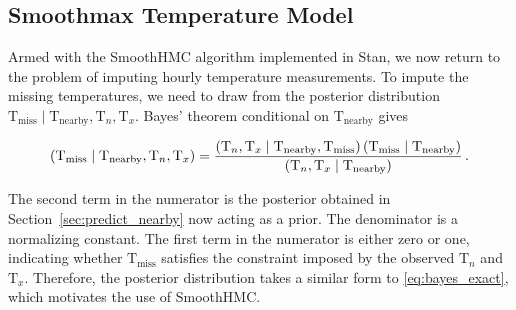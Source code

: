 \documentclass[letter]{article}
\newcommand{\genericdel}[3]{%
      \left#1#3\right#2
    }
\newcommand{\del}[1]{\genericdel(){#1}}
\let\Pr\relax
\DeclareMathOperator{\Pr}{\mathbb{P}}
\newcommand{\T}{\mathrm{T}}
\newcommand{\Tn}{\T_{n}}
\newcommand{\Tx}{\T_{x}}
\newcommand{\miss}{\mathrm{miss}}
\newcommand{\obs}{\mathrm{nearby}}
\begin{document}
        \subsection{Smoothmax Temperature Model}\label{smoothmax-temperature-model}
    


        Armed with the SmoothHMC algorithm implemented in Stan, we now return to the problem of imputing hourly temperature measurements.
To impute the missing temperatures, we need to draw from the posterior distribution \(\T_\miss \mid \T_\obs, \Tn, \Tx\).
Bayes' theorem conditional on \(\T_\obs\) gives

\begin{equation}
    \Pr\del{\T_\miss \mid \T_\obs, \Tn, \Tx} = \frac{
        \Pr\del{\Tn, \Tx \mid \T_\obs, \T_\miss } 
        \Pr\del{\T_\miss \mid \T_\obs}
        }{
        \Pr\del{\Tn, \Tx \mid \T_\obs}
        }\,.
\end{equation}

The second term in the numerator is the posterior obtained in Section~\ref{sec:predict_nearby} now acting as a prior.
The denominator is a normalizing constant.
The first term in the numerator is either zero or one, indicating whether \(\T_\miss\) satisfies the constraint imposed by the observed \(\Tn\) and \(\Tx\).
Therefore, the posterior distribution takes a similar form to \eqref{eq:bayes_exact}, which motivates the use of SmoothHMC.
    
\end{document}
